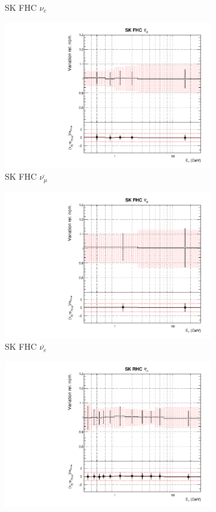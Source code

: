 \begin{figure}
\begin{subfigure}{0.24\textwidth}
  \caption{SK FHC $\nu_e$}
\end{subfigure}
\begin{subfigure}{0.24\textwidth}
  \centering
  \includegraphics[width=0.95\linewidth]{figs/asmvflux10}
  \caption{SK FHC $\bar{\nu_{\mu}}$}
\end{subfigure}
\begin{subfigure}{0.24\textwidth}
  \centering
  \includegraphics[width=0.95\linewidth]{figs/asmvflux11}
  \caption{SK FHC $\bar{\nu_{e}}$}
\end{subfigure}
\begin{subfigure}{0.24\textwidth}
  \centering
  \includegraphics[width=0.95\linewidth]{figs/asmvflux12}

\end{subfigure}
\end{figure}
